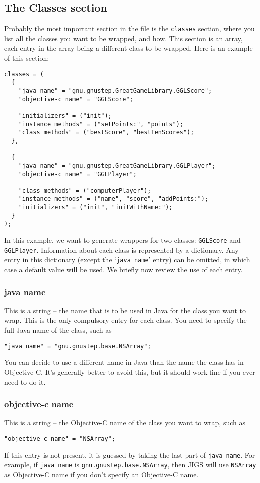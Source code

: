 \subsection{The Classes section}
Probably the most important section in the file is the
\texttt{classes} section, where you list all the classes you want to
be wrapped, and how.  This section is an array, each entry in the
array being a different class to be wrapped.  Here is an example 
of this section:
\begin{verbatim}
classes = (
  {
    "java name" = "gnu.gnustep.GreatGameLibrary.GGLScore";
    "objective-c name" = "GGLScore";

    "initializers" = ("init"); 
    "instance methods" = ("setPoints:", "points");
    "class methods" = ("bestScore", "bestTenScores");
  },

  {
    "java name" = "gnu.gnustep.GreatGameLibrary.GGLPlayer";
    "objective-c name" = "GGLPlayer";

    "class methods" = ("computerPlayer");
    "instance methods" = ("name", "score", "addPoints:");
    "initializers" = ("init", "initWithName:");                 
  }
);
\end{verbatim}
In this example, we want to generate wrappers for two classes:
\texttt{GGLScore} and \texttt{GGLPlayer}.  Information about each 
class is represented by a dictionary.  Any entry in this dictionary
(except the `\texttt{java name}' entry) can be omitted, in which case
a default value will be used.  We briefly now review the use of each
entry.

\subsubsection{java name}
This is a string -- the name that is to be used in Java for the class
you want to wrap.  This is the only compulsory entry for each class.
You need to specify the full Java name of the class, such as
\begin{verbatim}
"java name" = "gnu.gnustep.base.NSArray";
\end{verbatim}
You can decide to use a different name in Java than the name the class
has in Objective-C.  It's generally better to avoid this, but it
should work fine if you ever need to do it.  

\subsubsection{objective-c name}
This is a string -- the Objective-C name of the class you want to
wrap, such as 
\begin{verbatim}
"objective-c name" = "NSArray";
\end{verbatim}
If this entry is not present, it is guessed by taking the last part of
\texttt{java name}.  For example, if \texttt{java name} is 
\texttt{gnu.gnustep.base.NSArray}, then JIGS will use \texttt{NSArray} 
as Objective-C name if you don't specify an Objective-C name.

